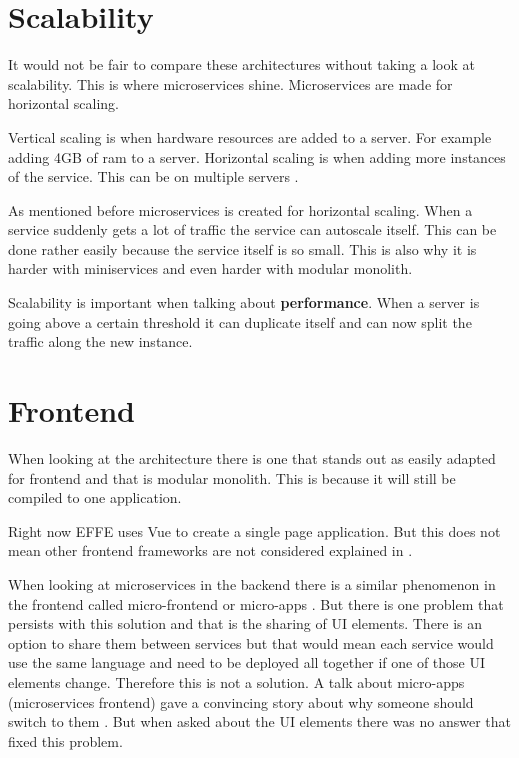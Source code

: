\section{Scalability}
\label{sec:Scalability}

It would not be fair to compare these architectures without taking a look at scalability. This is where microservices shine. Microservices are made for horizontal scaling.

Vertical scaling is when hardware resources are added to a server. For example adding 4GB of ram to a server. Horizontal scaling is when adding more instances of the service. This can be on multiple servers \cite{microservicesMultipleServer}.

As mentioned before microservices is created for horizontal scaling. When a service suddenly gets a lot of traffic the service can autoscale itself. This can be done rather easily because the service itself is so small. This is also why it is harder with miniservices and even harder with modular monolith.

Scalability is important when talking about \textbf{performance}. When a server is going above a certain threshold it can duplicate itself and can now split the traffic along the new instance.

\section{Frontend}
\label{sec:FrontendComparison}

When looking at the architecture there is one that stands out as easily adapted for frontend and that is modular monolith. This is because it will still be compiled to one application.

Right now EFFE uses Vue to create a single page application. But this does not mean other frontend frameworks are not considered explained in .

When looking at microservices in the backend there is a similar phenomenon in the frontend called micro-frontend or micro-apps \cite{microFrontends}. But there is one problem that persists with this solution and that is the sharing of UI elements. There is an option to share them between services but that would mean each service would use the same language and need to be deployed all together if one of those UI elements change. Therefore this is not a solution. A talk about micro-apps (microservices frontend) gave a convincing story about why someone should switch to them \cite{frontendMicroservices}. But when asked about the UI elements there was no answer that fixed this problem.

